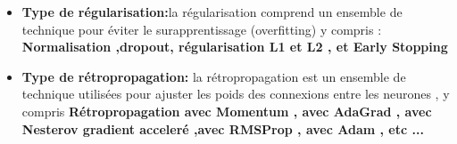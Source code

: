 \begin{itemize}[label=$\bullet$]
    \item \textbf{Type de régularisation:}la régularisation comprend un ensemble de technique pour éviter le surapprentissage (overfitting) y compris :  \textbf{Normalisation ,dropout, régularisation L1 et L2 , et Early Stopping} 
    
    \item \textbf{Type de rétropropagation:} la rétropropagation est un ensemble de technique utilisées pour ajuster les poids des connexions entre les neurones , y compris \textbf{Rétropropagation avec Momentum , avec AdaGrad , avec Nesterov  gradient acceleré ,avec RMSProp , avec Adam , etc ... }
    
    \end{itemize}
    
    



